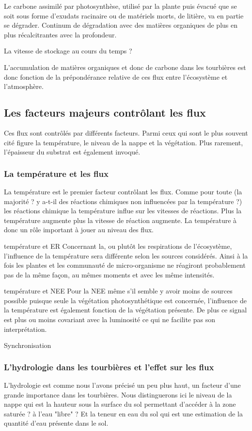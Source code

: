 Le carbone assimilé par photosynthèse, utilisé par la plante puis évacué que se soit sous forme d'exudats racinaire ou de matériels morts, de litière, va en partie se dégrader.
Continum de dégradation avec des matières organiques de plus en plus récalcitrantes avec la profondeur.

La vitesse de stockage au cours du temps ?

L'accumulation de matières organiques et donc de carbone dans les tourbières est donc fonction de la prépondérance relative de ces flux entre l'écosystème et l'atmosphère.

\subsection{Les facteurs majeurs contrôlant les flux}

Ces flux sont contrôlés par différents facteurs.
Parmi ceux qui sont le plus souvent cité figure la température, le niveau de la nappe et la végétation.
Plus rarement, l'épaisseur du substrat est également invoqué.

\subsubsection{La température et les flux}
La température est le premier facteur contrôlant les flux.
Comme pour toute (la majorité ? y a-t-il des réactions chimiques non influencées par la température ?) les réactions chimique la température influe sur les vitesses de réactions. 
Plus la température augmente plus la vitesse de réaction augmente.
La température à donc un rôle important à jouer au niveau des flux.

température et ER
Concernant la, ou plutôt les respirations de l'écosystème, l'influence de la température sera différente selon les sources considérés.
Ainsi à la fois les plantes et les communauté de micro-organisme ne réagiront probablement pas de la même façon, au mêmes moments et avec les même intensités.

température et NEE
Pour la NEE même s'il semble y avoir moins de sources possible puisque seule la végétation photosynthétique est concernée, l'influence de la température est également fonction de la végétation présente.
De plus ce signal est plus ou moins covariant avec la luminosité ce qui ne facilite pas son interprétation.

Synchronisation


\subsubsection{L'hydrologie dans les tourbières et l'effet sur les flux}
L'hydrologie est comme nous l'avons précisé un peu plus haut, un facteur d'une grande importance dans les tourbières.
Nous distinguerons ici le niveau de la nappe qui est la hauteur sous la surface du sol permettant d'accéder à la zone saturée ? à l'eau "libre" ?
Et la teneur en eau du sol qui est une estimation de la quantité d'eau présente dans le sol.

